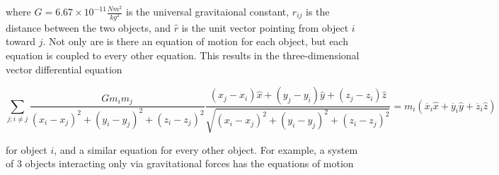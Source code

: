 \documentclass{report}
\begin{document}
            where $G = 6.67 \times 10^{-11} \frac{N m^2}{kg^2}$ is the universal gravitaional constant, $r_{ij}$ is the distance between the two objects, and $\hat{r}$ is the unit vector pointing from object $i$ toward $j$.  Not only are is there an equation of motion for each object, but each equation is coupled to every other equation.  This results in the three-dimensional vector differential equation

            \begin{equation}
                \sum_{j; i \neq j} \frac{G m_i m_j}{(x_i - x_j)^2 + (y_i - y_j)^2 + (z_i - z_j)^2} \frac{(x_j - x_i) \hat{x} + (y_j - y_i) \hat{y} + (z_j - z_i) \hat{z}}{\sqrt{(x_i - x_j)^2 + (y_i - y_j)^2 + (z_i - z_j)^2}} = m_i (\ddot{x_i} \hat{x} + \ddot{y_i} \hat{y} + \ddot{z_i} \hat{z})
            \end{equation}

            for object $i$, and a similar equation for every other object.  For example, a system of 3 objects interacting only via gravitational forces has the equations of motion 
\end{document}
